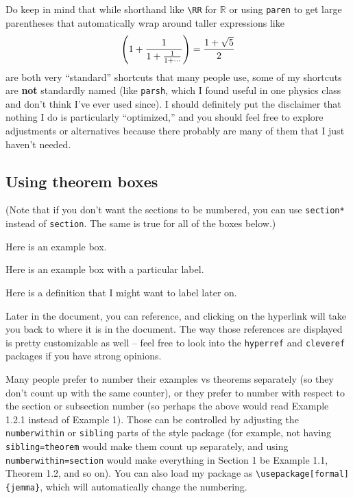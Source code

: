 \documentclass[11pt]{article}
\begin{document}
\begin{remark*}
Do keep in mind that while shorthand like \texttt{\textbackslash RR} for $\mathbb{R}$ or using \texttt{paren} to get large parentheses that automatically wrap around taller expressions like
\[
    \left(1 + \frac{1}{1 + \frac{1}{1 + \cdots}}\right) = \frac{1 + \sqrt{5}}{2}
\]
are both very ``standard'' shortcuts that many people use, some of my shortcuts are \textbf{not} standardly named (like \texttt{parsh}, which I found useful in one physics class and don't think I've ever used since). I should definitely put the disclaimer that nothing I do is particularly ``optimized,'' and you should feel free to explore adjustments or alternatives because there probably are many of them that I just haven't needed.
\end{remark*}

\subsection{Using theorem boxes}

(Note that if you don't want the sections to be numbered, you can use \texttt{section*} instead of \texttt{section}. The same is true for all of the boxes below.)

\begin{example}
Here is an example box.
\end{example}

\begin{theorem}
Here is an example box with a particular label.
\end{theorem}

\begin{definition}\label{usefulthing}
Here is a definition that I might want to label later on.
\end{definition}

Later in the document, you can reference, and clicking on the hyperlink will take you back to where it is in the document. The way those references are displayed is pretty customizable as well -- feel free to look into the \texttt{hyperref} and \texttt{cleveref} packages if you have strong opinions.

Many people prefer to number their examples vs theorems separately (so they don't count up with the same counter), or they prefer to number with respect to the section or subsection number (so perhaps the above would read Example 1.2.1 instead of Example 1). Those can be controlled by adjusting the \texttt{numberwithin} or \texttt{sibling} parts of the style package (for example, not having \texttt{sibling=theorem} would make them count up separately, and using \texttt{numberwithin=section} would make everything in Section 1 be Example 1.1, Theorem 1.2, and so on). You can also load my package as \texttt{\textbackslash usepackage[formal]\{jemma\}}, which will automatically change the numbering.
\end{document}
